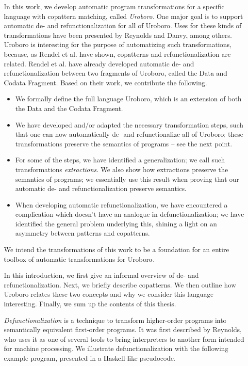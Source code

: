In this work, we develop automatic program transformations for a specific language with copattern matching, called \textit{Uroboro}. One major goal is to support automatic de- and refunctionalization for all of Uroboro. Uses for these kinds of transformations have been presented by Reynolds and Danvy, among others. Uroboro is interesting for the purpose of automatizing such transformations, because, as Rendel et al.\cite{rendel15automatic} have shown, copatterns and refunctionalization are related. Rendel et al. have already developed automatic de- and refunctionalization between two fragments of Uroboro, called the Data and Codata Fragment. Based on their work, we contribute the following.
\begin{itemize}
\item We formally define the full language Uroboro, which is an extension of both the Data and the Codata Fragment.

\item We have developed and/or adapted the necessary transformation steps, such that one can now automatically de- and refunctionalize all of Uroboro; these transformations preserve the semantics of programs -- see the next point.

\item For some of the steps, we have identified a generalization; we call such transformations \textit{extractions}. We also show how extractions preserve the semantics of programs; we essentially use this result when proving that our automatic de- and refunctionalization preserve semantics.

\item When developing automatic refunctionalization, we have encountered a complication which doesn't have an analogue in defunctionalization; we have identified the general problem underlying this, shining a light on an asymmetry between patterns and copatterns.
\end{itemize}
We intend the transformations of this work to be a foundation for an entire toolbox of automatic transformations for Uroboro.

In this introduction, we first give an informal overview of de- and refunctionalization. Next, we briefly describe copatterns. We then outline how Uroboro relates these two concepts and why we consider this language interesting. Finally, we sum up the contents of this thesis.

\textit{Defunctionalization} is a technique to transform higher-order programs into semantically equivalent first-order programs. It was first described by Reynolds\cite{reynolds72definitional}, who uses it as one of several tools to bring interpreters to another form intended for machine processing. We illustrate defunctionalization with the following example program, presented in a Haskell-like pseudocode.

